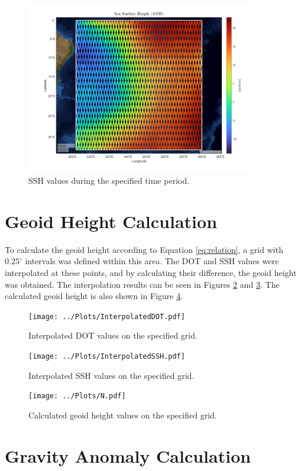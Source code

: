 \documentclass[12pt]{article}
\begin{document}
	\begin{figure}[h!]
		\centering
		\includegraphics[height=7.5cm]{../Plots/SSH.pdf}
		\caption{SSH values during the specified time period.}
		\label{fig:SSH}
	\end{figure}
	\clearpage
	
	\section{Geoid Height Calculation}
	To calculate the geoid height according to Equation \ref{eq:relation}, a grid with $0.25^\circ$ intervals was defined within this area. The DOT and SSH values were interpolated at these points, and by calculating their difference, the geoid height was obtained. The interpolation results can be seen in Figures \ref{fig:DOTint} and \ref{fig:SSHint}. The calculated geoid height is also shown in Figure \ref{fig:N}.
	
	\begin{figure}[h!]
		\centering
		\texttt{[image: ../Plots/InterpolatedDOT.pdf]}
		\caption{Interpolated DOT values on the specified grid.}
		\label{fig:DOTint}
	\end{figure}
	
	\begin{figure}[h!]
		\centering
		\texttt{[image: ../Plots/InterpolatedSSH.pdf]}
		\caption{Interpolated SSH values on the specified grid.}
		\label{fig:SSHint}
	\end{figure}
	\clearpage
	
	\begin{figure}[h!]
		\centering
		\texttt{[image: ../Plots/N.pdf]}
		\caption{Calculated geoid height values on the specified grid.}
		\label{fig:N}
	\end{figure}
	
	\section{Gravity Anomaly Calculation}
	
\end{document}
